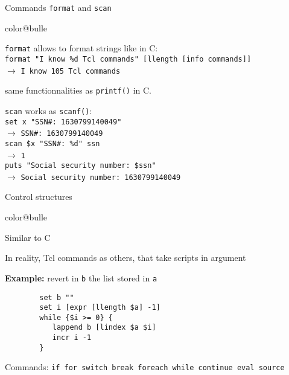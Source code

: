\documentclass[a4paper,landscape,smooth]{show}
\newcommand{\tclex}[2]{\texttt{#1}\\$\rightarrow$ \texttt{#2}}
\begin{document}
\begin{tslide}{Commands \texttt{format} and \texttt{scan}}
   \vfill
   \begin{bitemize}{color@bulle}
      \item \texttt{format} allows to format strings like in C:\\
	 \tclex{format "I know \%d Tcl commands" [llength [info commands]]}
         {I know 105 Tcl commands}\\
      \item same functionnalities as \texttt{printf()} in C.
      \item \texttt{scan} works as \texttt{scanf()}: \\
      \tclex{set x "SSN\#: 1630799140049"}{SSN\#: 1630799140049}\\
      \tclex{scan \$x "SSN\#: \%d" ssn}{1}\\
      \tclex{puts "Social security number: \$ssn"}{Social security number: 1630799140049}\\
   \end{bitemize}
   \vfill
\end{tslide}


\begin{tslide}{Control structures}
   \vfill
   \begin{bitemize}{color@bulle}
      \item Similar to C
      \item In reality, Tcl commands as others, that take scripts in argument
      \item \textbf{Example:} revert in \texttt{b} the list stored
	 in \texttt{a}\\ 
	 \begin{verbatim}
	    set b ""
	    set i [expr [llength $a] -1]
	    while {$i >= 0} {
	       lappend b [lindex $a $i]
	       incr i -1
	    }
	 \end{verbatim}
      \item Commands: \texttt{if for switch break foreach while continue
	 eval source} 
   \end{bitemize}
   \vfill
\end{tslide}

\end{document}
